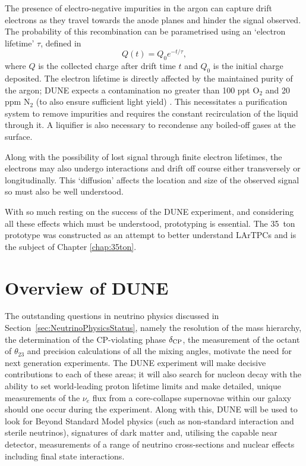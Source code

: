 The presence of electro-negative impurities in the argon can capture drift electrons as they travel towards the anode planes and hinder the signal observed.  The probability of this recombination can be parametrised using an `electron lifetime' $\tau$, defined in
\begin{equation}\label{eq:ElectronLifetime}
  Q(t) = Q_0 e^{-t/\tau},
\end{equation}
where $Q$ is the collected charge after drift time $t$ and $Q_0$ is the initial charge deposited.  The electron lifetime is directly affected by the maintained purity of the argon; DUNE expects a contamination no greater than 100 ppt O$_2$ and 20 ppm N$_2$ (to also ensure sufficient light yield) \cite{DUNECDR4}.  This necessitates a purification system to remove impurities and requires the constant recirculation of the liquid through it.  A liquifier is also necessary to recondense any boiled-off gases at the surface.

Along with the possibility of lost signal through finite electron lifetimes, the electrons may also undergo interactions and drift off course either transversely or longitudinally.  This `diffusion' affects the location and size of the observed signal so must also be well understood.

With so much resting on the success of the DUNE experiment, and considering all these effects which must be understood, prototyping is essential.  The 35~ton prototype was constructed as an attempt to better understand LArTPCs and is the subject of Chapter \ref{chap:35ton}.

\section{Overview of DUNE}\label{sec:DUNEOverview}

The outstanding questions in neutrino physics discussed in Section~\ref{sec:NeutrinoPhysicsStatus}, namely the resolution of the mass hierarchy, the determination of the CP-violating phase $\delta_{\textnormal{CP}}$, the measurement of the octant of $\theta_{23}$ and precision calculations of all the mixing angles, motivate the need for next generation experiments.  The DUNE experiment will make decisive contributions to each of these areas; it will also search for nucleon decay with the ability to set world-leading proton lifetime limits and make detailed, unique measurements of the $\nu_e$ flux from a core-collapse supernovae within our galaxy should one occur during the experiment.  Along with this, DUNE will be used to look for Beyond Standard Model physics (such as non-standard interaction and sterile neutrinos), signatures of dark matter and, utilising the capable near detector, measurements of a range of neutrino cross-sections and nuclear effects including final state interactions.


